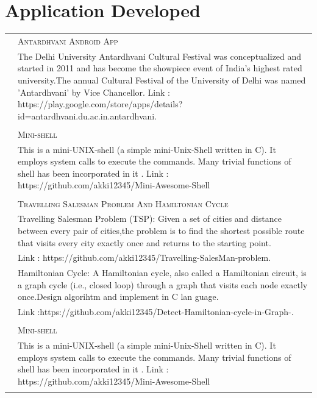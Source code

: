 \documentclass[]{uniqueness_cv}
\begin{document}
\begin{minipage}[t]{0.66\textwidth}
\section{ \textcolor{gray}{} Application Developed}
\begin{tabular}{r|p{11cm}}
\runsubsection{\textsc{Fab'2015} & \textsc{Antardhvani Android App}}\\&\footnotesize{The Delhi University Antardhvani Cultural Festival was conceptualized and started in 2011 and has become the showpiece event of India’s highest rated university.The annual Cultural Festival of the University of Delhi was named ’Antardhvani’ by Vice Chancellor.
Link : https://play.google.com/store/apps/details?id=antardhvani.du.ac.in.antardhvani.}\\\\
\runsubsection{\textsc{Nov'2014} & \textsc{Mini-shell}}\\&\footnotesize{This is a mini-UNIX-shell (a simple mini-Unix-Shell written in C). It employs system calls to execute the commands. Many trivial functions of shell has been incorporated in it   .
Link : https://github.com/akki12345/Mini-Awesome-Shell}\\\\
\runsubsection{\textsc{dec'2014} & \textsc{Travelling Salesman Problem And Hamiltonian Cycle}}\\&\footnotesize{Travelling Salesman Problem (TSP): Given a set of cities and distance between every pair of cities,the problem is to find the shortest possible route that visits every city exactly once and returns to the starting point.}
\\&\footnotesize{Link : https://github.com/akki12345/Travelling-SalesMan-problem.}
\\&\footnotesize{Hamiltonian Cycle: A Hamiltonian cycle, also called a Hamiltonian circuit, is a graph cycle (i.e., closed loop) through a graph that visits each node exactly once.Design algorihtm and implement in C lan
guage.}
\\&\footnotesize{Link :https://github.com/akki12345/Detect-Hamiltonian-cycle-in-Graph-.}\\\\
\runsubsection{\textsc{Nov'2014} & \textsc{Mini-shell}}\\&\footnotesize{This is a mini-UNIX-shell (a simple mini-Unix-Shell written in C). It employs system calls to execute the commands. Many trivial functions of shell has been incorporated in it   .
Link : https://github.com/akki12345/Mini-Awesome-Shell}\\\\
\end{tabular}

\end{minipage}
\end{document}
